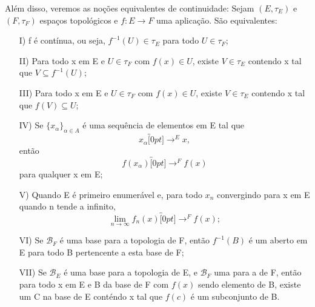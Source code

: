 \documentclass[../distribution_theory_notes.tex]{subfiles}
\begin{document}
Além disso, veremos as noções equivalentes de continuidade:
Sejam \((E, \tau_{E})\) e \((F, \tau_{F})\) espaços topológicos e \(f:E\rightarrow F\) uma aplicação. São equivalentes:
\begin{itemize}
	\item[I)] f é contínua, ou seja, \(f^{-1}(U)\in \tau_E\) para todo \(U\in \tau_F\);
	\item[II)] Para todo x em E e \(U\in \tau_{F}\) com \(f(x)\in U\), existe \(V\in \tau_{E}\) contendo x tal que \(V\subseteq f^{-1}(U)\);
	\item[III)] Para todo x em E e \(U\in \tau_{F}\) com \(f(x)\in U\), existe \(V\in \tau_{E}\) contendo x tal que \(f(V)\subseteq U\);
	\item[IV)] Se \(\{x_{\alpha }\}_{\alpha \in A}\) é uma sequência de elementos em E tal que
	      \[
		      x_{\alpha }\overbracket[0pt]{\longrightarrow}^{E}x,
	      \]
	      então
	      \[
		      f(x_{\alpha })\overbracket[0pt]{\longrightarrow}^{F}f(x)
	      \]
	      para qualquer x em E;
	\item[V)] Quando E é primeiro enumerável e, para todo \(x_{n}\) convergindo para x em E quando n tende a infinito,
	      \[
		      \lim_{n\to \infty}f_{n}(x)\overbracket[0pt]{\longrightarrow}^{F}f(x);
	      \]
	\item[VI)] Se \(\mathcal{B}_{F}\) é uma base para a topologia de F, então \(f^{-1}(B)\) é um aberto em E para todo B pertencente a esta base de F;
	\item[VII)] Se \(\mathcal{B}_{E}\) é uma base para a topologia de E, e \(\mathcal{B}_{F} \) uma para a de F, então para todo x em E e B da base de F com \(f(x)\) sendo elemento de B, existe um C na base de E conténdo x tal que \(f(c)\) é um subconjunto de B.
\end{itemize}
\end{document}
